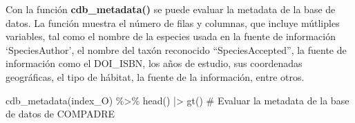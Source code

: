 \documentclass[
  12pt,
  letterpaper,
]{book}
\newenvironment{Shaded}{\begin{snugshade}}{\end{snugshade}}
\newcommand{\CommentTok}[1]{\textcolor[rgb]{0.37,0.37,0.37}{#1}}
\newcommand{\FunctionTok}[1]{\textcolor[rgb]{0.28,0.35,0.67}{#1}}
\newcommand{\NormalTok}[1]{\textcolor[rgb]{0.00,0.23,0.31}{#1}}
\newcommand{\SpecialCharTok}[1]{\textcolor[rgb]{0.37,0.37,0.37}{#1}}
\begin{document}
Con la función \textbf{cdb\_metadata()} se puede evaluar la metadata de
la base de datos. La función muestra el número de filas y columnas, que
incluye mútliples variables, tal como el nombre de la especies usada en
la fuente de información `SpeciesAuthor', el nombre del taxón reconocido
``SpeciesAccepted'', la fuente de información como el DOI\_ISBN, los
años de estudio, sus coordenadas geográficas, el tipo de hábitat, la
fuente de la información, entre otros.

\begin{Shaded}
\begin{Highlighting}[]
\FunctionTok{cdb\_metadata}\NormalTok{(index\_O) }\SpecialCharTok{\%\textgreater{}\%} \FunctionTok{head}\NormalTok{() }\SpecialCharTok{|\textgreater{}} \FunctionTok{gt}\NormalTok{() }\CommentTok{\# Evaluar la metadata de la base de datos de COMPADRE}
\end{Highlighting}
\end{Shaded}
\end{document}
